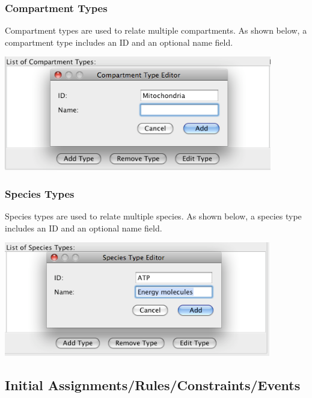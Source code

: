 \documentclass[titlepage,11pt]{article}
\begin{document}
\clearpage

\subsubsection{\label{compTypes}Compartment Types}

\noindent
Compartment types are used to relate multiple compartments.  As shown
below, a compartment type includes an ID and an optional name field.
\begin{center}
\includegraphics[height=50mm]{screenshots/compType}
\end{center}

\subsubsection{\label{specTypes}Species Types}

\noindent
Species types are used to relate multiple species.  As shown below, a 
species type includes an ID and an optional name field.
\begin{center}
\includegraphics[height=50mm]{screenshots/specType}
\end{center}

\clearpage

\subsection{\label{InitRuleConstEvent}Initial Assignments/Rules/Constraints/Events}
\end{document}
